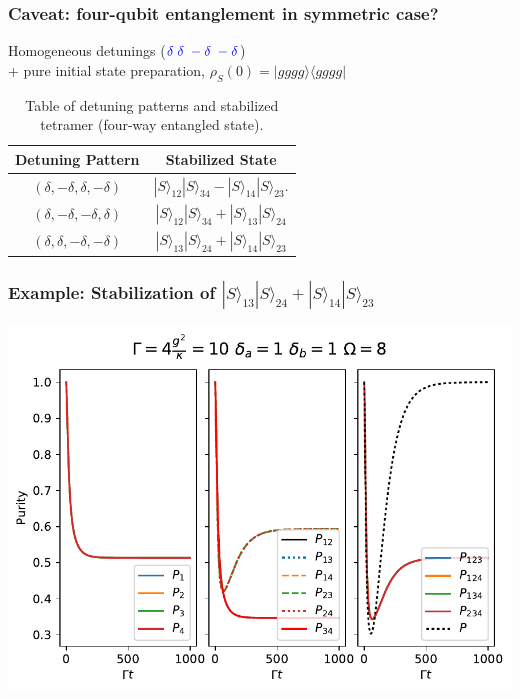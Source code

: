 \documentclass{beamer}
\begin{document}
\begin{frame}
\frametitle{Caveat: four-qubit entanglement in symmetric case?}

Homogeneous detunings ($\textcolor{blue}{\delta \; \delta \; -\delta \; - \delta}$) \\+ pure initial state preparation, $\rho_S(0) = | gggg \rangle \langle gggg | $


 \begin{table}\label{Bell State Table}
\begin{tabular}{c|c}
Detuning Pattern & Stabilized State \\
\hline
$( \delta , - \delta , \delta , - \delta  )$ & $| S \rangle_{12} | S \rangle_{34} - | S \rangle_{14} | S \rangle_{23}.$  \\
$( \delta , - \delta , -\delta ,  \delta  )$ & $ | S \rangle_{12} | S \rangle_{34} + | S \rangle_{13} | S \rangle_{24}$  \\
$( \delta , \delta , - \delta , - \delta  )$  & $ | S \rangle_{13} | S \rangle_{24} + | S \rangle_{14} | S \rangle_{23}$ 
\end{tabular}
\caption{Table of detuning patterns and stabilized tetramer (four-way entangled state).}
\end{table}
\end{frame}

\begin{frame}
\frametitle{Example: Stabilization of  $| S \rangle_{13} | S \rangle_{24} + | S \rangle_{14} | S \rangle_{23}$}

\centering
\includegraphics[scale=0.6]{Sym_Homo.pdf}



\end{frame}
\end{document}
